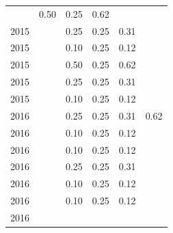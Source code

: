 \begin{table}[H]
\begin{tabular}{| l | c | c | c | c | c |}
          &
          0.50
          &
          0.25
          &
          0.62
          &
          \\
            2015
          &
          
          &
          0.25
          &
          0.25
          &
          0.31
          &
          \\
            2015
          &
          
          &
          0.10
          &
          0.25
          &
          0.12
          &
          \\
            2015
          &
          
          &
          0.50
          &
          0.25
          &
          0.62
          &
          \\
            2015
          &
          
          &
          0.25
          &
          0.25
          &
          0.31
          &
          \\
            2015
          &
          
          &
          0.10
          &
          0.25
          &
          0.12
          &
          \\
\hline
            2016
          &
          
          &
          0.25
          &
          0.25
          &
          0.31
          &
            {\color{blue} 0.62}
          \\
            2016
          &
          
          &
          0.10
          &
          0.25
          &
          0.12
          &
          \\
            2016
          &
          
          &
          0.10
          &
          0.25
          &
          0.12
          &
          \\
            2016
          &
          
          &
          0.25
          &
          0.25
          &
          0.31
          &
          \\
            2016
          &
          
          &
          0.10
          &
          0.25
          &
          0.12
          &
          \\
            2016
          &
          
          &
          0.10
          &
          0.25
          &
          0.12
          &
          \\
            2016
          &
          

\end{tabular}
\end{table}
